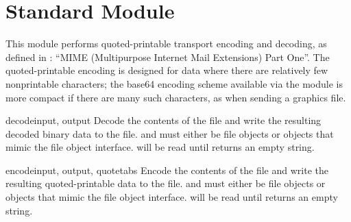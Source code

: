 \section{Standard Module }
\label{module-quopri}

This module performs quoted-printable transport encoding and decoding,
as defined in : ``MIME (Multipurpose Internet Mail Extensions)
Part One''.  The quoted-printable encoding is designed for data where
there are relatively few nonprintable characters; the base64 encoding
scheme available via the  module is more compact if there
are many such characters, as when sending a graphics file.


\begin{funcdesc}{decode}{input, output}
Decode the contents of the  file and write the resulting
decoded binary data to the  file.
 and  must either be file objects or objects that
mimic the file object interface.  will be read until
 returns an empty string.
\end{funcdesc}

\begin{funcdesc}{encode}{input, output, quotetabs}
Encode the contents of the  file and write the resulting
quoted-printable data to the  file.
 and  must either be file objects or objects that
mimic the file object interface.  will be read until
 returns an empty string.
\end{funcdesc}



